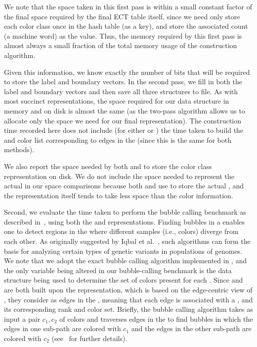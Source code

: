We note that the space taken in this first pass is within a small constant
factor of the final space required by the final ECT table itself, since we need
only store each color class once in the hash table (as a key), and store the
associated count (a machine word) as the value.  Thus, the memory required by
this first pass is almost always a small fraction of the total memory usage 
of the construction algorithm.

Given this information, we know exactly the number of bits that will be required
to store the label and boundary vectors. In the second pass, we fill in both the
label and boundary vectors and then save all three structures to file. As with
most succinct representations, the space required for our data structure in
memory and on disk is almost the same (as the two-pass algorithm allows us to
allocate only the space we need for our final representation). The construction
time recorded here does not include (for either \rainbowfish or \vari) the time taken
to build the \dbg and color list corresponding to edges in the \dbg (since this
is the same for both methods).

We also report the space needed by both \rainbowfish and \vari to store the color class
representation on disk. We do not include the space needed to represent the
actual \dbg in our space comparisons because both \rainbowfish and \vari use \boss
to store the actual \dbg, and the \boss representation itself tends to take less
space than the color information.

Second, we evaluate the time taken to perform the bubble calling benchmark as
described in~\cite{MuggliBoNo17}, using both the \vari and \rainbowfish
representations. Finding bubbles in a \cdbg enables one to detect regions in the
\dbg where different samples (i.e., colors) diverge from each other. As
originally suggested by Iqbal et al.~\cite{Iqbal2012Novo}, such algorithms can
form the basis for analyzing certain types of genetic variants in populations of
genomes. We note that we adopt the exact bubble calling algorithm implemented in
\vari, and the only variable being altered in our bubble-calling benchmark is
the data structure being used to determine the set of colors present for each
\kmer. Since \vari and \rainbowfish are both built upon the \boss representation,
which is based on the edge-centric view of \dbg, they consider \kmers as edges
in the \dbg, meaning that each edge is associated with a \kmer, and its
corresponding rank and color set. Briefly, the bubble calling algorithm takes as
input a pair $c_1,c_2$ of colors and traverses edges in the \dbg to find bubbles
in which the edges in one sub-path are colored with $c_1$ and the edges in the
other sub-path are colored with $c_2$ (see~\cite{MuggliBoNo17} for further
details).

